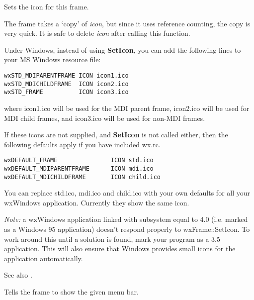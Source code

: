 \label{wxframeseticon}


Sets the icon for this frame.




The frame takes a `copy' of {\it icon}, but since it uses reference
counting, the copy is very quick. It is safe to delete {\it icon} after
calling this function.

Under Windows, instead of using {\bf SetIcon}, you can add the
following lines to your MS Windows resource file:

\begin{verbatim}
wxSTD_MDIPARENTFRAME ICON icon1.ico
wxSTD_MDICHILDFRAME  ICON icon2.ico
wxSTD_FRAME          ICON icon3.ico
\end{verbatim}

where icon1.ico will be used for the MDI parent frame, icon2.ico
will be used for MDI child frames, and icon3.ico will be used for
non-MDI frames.

If these icons are not supplied, and {\bf SetIcon} is not called either,
then the following defaults apply if you have included wx.rc.

\begin{verbatim}
wxDEFAULT_FRAME               ICON std.ico
wxDEFAULT_MDIPARENTFRAME      ICON mdi.ico
wxDEFAULT_MDICHILDFRAME       ICON child.ico
\end{verbatim}

You can replace std.ico, mdi.ico and child.ico with your own defaults
for all your wxWindows application. Currently they show the same icon.

{\it Note:} a wxWindows application linked with subsystem equal to 4.0
(i.e. marked as a Windows 95 application) doesn't respond properly
to wxFrame::SetIcon. To work around this until a solution is found,
mark your program as a 3.5 application. This will also ensure
that Windows provides small icons for the application automatically.

See also .

\label{wxframesetmenubar}


Tells the frame to show the given menu bar.

